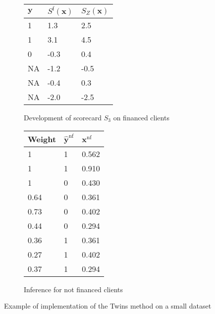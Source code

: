 \begin{figure}
{\begin{multicols}{4}
\begin{subfigure}[t]{0.22\textwidth}
\begin{center}
\begin{adjustbox}{max width=0.95\textwidth}
\begin{tabular}{l l l}
\toprule
\textbf{${\bm{y}}$} & \textbf{$S^{\text{f}}({\bm{x}})$} & \textbf{$S_Z({\bm{x}})$}\\
\midrule
1 & 1.3 & 2.5\\
1 & 3.1 & 4.5 \\
0 & -0.3 & 0.4 \\
NA & -1.2 & -0.5 \\
NA & -0.4 & 0.3 \\
NA & -2.0 & -2.5 \\
\bottomrule
\end{tabular}
\end{adjustbox}
\end{center}

\caption{Development of scorecard $S_3$ on financed clients}
\label{twins:sfig3}
\end{subfigure}

\columnbreak

\begin{subfigure}[t]{0.22\textwidth}
\begin{center}
\begin{adjustbox}{max width=0.95\textwidth}
\begin{tabular}{l l l}
\toprule
\textbf{Weight} & \textbf{$\hat{\bm{y}}^{\text{nf}}$} & \textbf{${\bm{x}}^{\text{nf}}$}\\
\midrule
1 & 1 & 0.562 \\
1 & 1 & 0.910 \\
1 & 0 & 0.430 \\
0.64 & 0 & 0.361 \\
0.73 & 0 & 0.402 \\
0.44 & 0 & 0.294 \\
0.36 & 1 & 0.361 \\
0.27 & 1 & 0.402 \\
0.37 & 1 & 0.294 \\
\bottomrule
\end{tabular}
\end{adjustbox}
\end{center}

\caption{Inference for not financed clients}
\label{twins:sfig4}
\end{subfigure}

\end{multicols}
}
\caption{Example of implementation of the Twins method on a small dataset}
\label{twins}
\end{figure}


